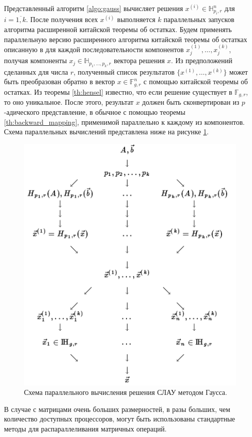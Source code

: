 \documentclass[master, och, diploma, times]{sty/SCWorks}
\theoremstyle{plain}
\theoremstyle{definition}
\numberwithin{equation}{section}
\begin{document}
Представленный алгоритм \ref{algo:gauss} вычисляет решения $x^{(i)} \in \mathbb{H}_{p_i,r}^n$ для $i = \overline{1,k}$. После получения всех $x^{(i)}$ выполняется $k$ параллельных запусков алгоритма расширенной китайской теоремы об остатках. Будем применять параллельную версию расширенного алгоритма китайской теоремы об остатках описанную в \cite{bib:numbers:limongelli} для каждой последовательности компонентов $x_j^{(1)}, \dots, x_j^{(k)}$, получая компоненты $x_j \in \mathbb{H}_{p_1,\dots,p_k,r}$ вектора решения $x$.
Из предположений сделанных для числа $r$, полученный список результатов $\{x^{(1)},\dots,x^{(k)}\}$ может быть преобразован обратно в вектор $x \in \mathbb{F}_{g,r}^n$ с помощью китайской теоремы об остатках. Из теоремы \ref{th:hensel} известно, что если решение существует в $\mathbb{F}_{g,r}$, то оно уникальное.
После этого, результат $x$ должен быть сконвертирован из $p$-адического представление, в обычное с помощью теоремы \ref{th:backward_mapping}, применимой параллельно к каждому из компонентов. Схема параллельных вычислений представлена ниже на рисунке \ref{img:multi:gauss}.

\begin{figure}[H]
\centerline{\includegraphics[width=0.7\linewidth]{images/multi/native.png}}
\caption{Схема параллельного вычисления решения СЛАУ методом Гаусса.}
\label{img:multi:gauss}
\end{figure}


В случае с матрицами очень больших размерностей, в разы больших, чем количество доступных процессоров, могут быть использованы стандартные методы для распараллеливания матричных операций.
\end{document}
